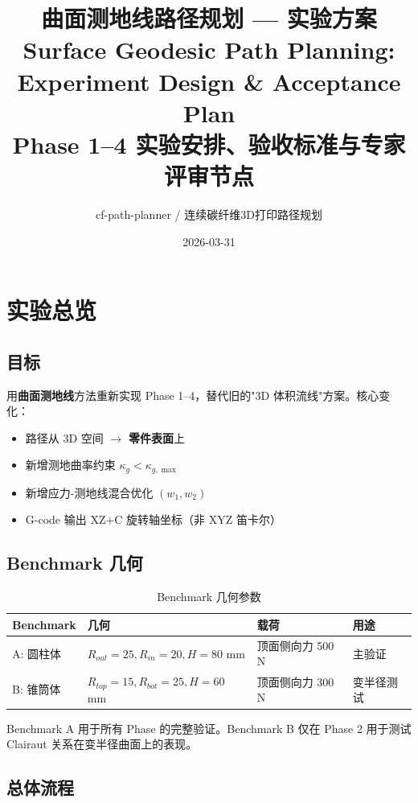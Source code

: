 \documentclass[11pt,a4paper]{article}
\title{\vspace{-1cm}\textsf{\textbf{曲面测地线路径规划 --- 实验方案}}\\
\large Surface Geodesic Path Planning: Experiment Design \& Acceptance Plan\\[0.3em]
\normalsize Phase 1--4 实验安排、验收标准与专家评审节点}
\author{cf-path-planner / 连续碳纤维3D打印路径规划}
\date{2026-03-31}
\begin{document}
\maketitle
\thispagestyle{fancy}

\tableofcontents
\newpage

\section{实验总览}

\subsection{目标}

用\textbf{曲面测地线}方法重新实现 Phase 1--4，替代旧的"3D 体积流线"方案。核心变化：
\begin{itemize}[nosep]
\item 路径从 3D 空间 $\to$ \textbf{零件表面}上
\item 新增测地曲率约束 $\kappa_g < \kappa_{g,\max}$
\item 新增应力-测地线混合优化 $(w_1, w_2)$
\item G-code 输出 XZ+C 旋转轴坐标（非 XYZ 笛卡尔）
\end{itemize}

\subsection{Benchmark 几何}

\begin{table}[H]
\centering
\begin{tabular}{llll}
\toprule
\textbf{Benchmark} & \textbf{几何} & \textbf{载荷} & \textbf{用途} \\
\midrule
A: 圆柱体 & $R_{out}=25, R_{in}=20, H=80$ mm & 顶面侧向力 500 N & 主验证 \\
B: 锥筒体 & $R_{top}=15, R_{bot}=25, H=60$ mm & 顶面侧向力 300 N & 变半径测试 \\
\bottomrule
\end{tabular}
\caption{Benchmark 几何参数}
\end{table}

Benchmark A 用于所有 Phase 的完整验证。Benchmark B 仅在 Phase 2 用于测试 Clairaut 关系在变半径曲面上的表现。

\subsection{总体流程}
\end{document}

